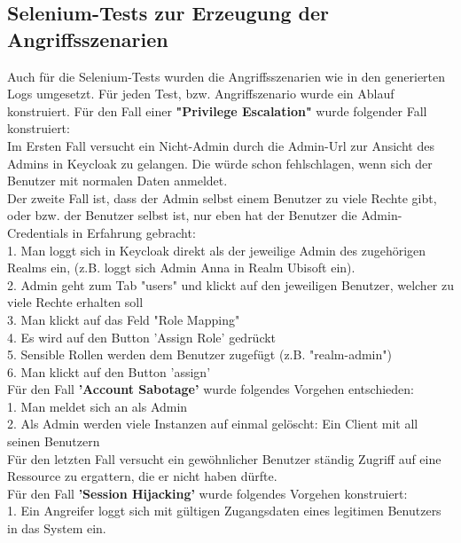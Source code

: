 \documentclass[a4paper,12pt]{article}
\begin{document}
	\subsection{Selenium-Tests zur Erzeugung der Angriffsszenarien}
	
	Auch für die Selenium-Tests wurden die Angriffsszenarien wie in den generierten Logs umgesetzt.
	Für jeden Test, bzw. Angriffszenario wurde ein Ablauf konstruiert.
	Für den Fall einer \textbf{"Privilege Escalation"} wurde folgender Fall konstruiert:
	\\[0.5em]
	Im Ersten Fall versucht ein Nicht-Admin durch die Admin-Url zur Ansicht des Admins in Keycloak zu gelangen. Die würde schon fehlschlagen, wenn sich der Benutzer mit normalen Daten anmeldet.
	\\[1.0em]
	Der zweite Fall ist, dass der Admin selbst einem Benutzer zu viele Rechte gibt, oder bzw. der Benutzer selbst ist, nur eben hat der Benutzer die Admin-Credentials in Erfahrung gebracht:
	\\[0.5em]
	1. Man loggt sich in Keycloak direkt als der jeweilige Admin des zugehörigen Realms ein, (z.B. loggt sich Admin Anna in Realm Ubisoft ein).
	\\[0.5em]
	2. Admin geht zum Tab "users" und klickt auf den jeweiligen Benutzer, welcher zu viele Rechte erhalten soll
	\\[0.5em]
	3. Man klickt auf das Feld "Role Mapping"
	\\[0.5em]
	4. Es wird auf den Button 'Assign Role' gedrückt
	\\[0.5em]
	5. Sensible Rollen werden dem Benutzer zugefügt (z.B. "realm-admin")
	\\[0.5em]
	6. Man klickt auf den Button  'assign'
	\\[1.0em]
	Für den Fall \textbf{'Account Sabotage'} wurde folgendes Vorgehen entschieden:
	\\[0.5em]
	1. Man meldet sich an als Admin
	\\[0.5em]
	2. Als Admin werden viele Instanzen auf einmal gelöscht: Ein Client mit all seinen Benutzern
	\\[0.5em]
	Für den letzten Fall versucht ein gewöhnlicher Benutzer ständig Zugriff auf eine Ressource zu ergattern, die er nicht haben dürfte.
	\\[1.0em]
	Für den Fall \textbf{’Session Hijacking’} wurde folgendes Vorgehen konstruiert:
	\\[0.5em]
	1. Ein Angreifer loggt sich mit gültigen Zugangsdaten eines legitimen Benutzers in das System ein.
	\\[0.5em]
\end{document}
